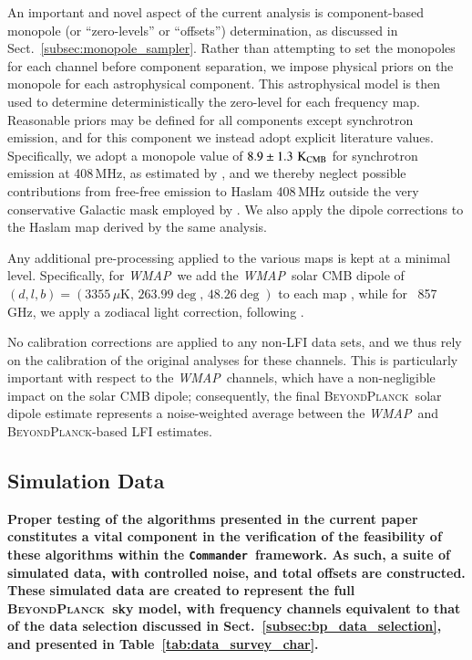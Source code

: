\documentclass[twocolumn]{aa}
\def\WMAP{\emph{WMAP}}
\def\commander{\texttt{Commander}}
\newcommand{\BP}{\textsc{BeyondPlanck}}
\begin{document}
An important and novel aspect of the current analysis is
component-based monopole (or ``zero-levels'' or ``offsets'')
determination, as discussed in Sect.~\ref{subsec:monopole_sampler}. Rather than
attempting to set the monopoles for each channel before component
separation, we impose physical priors on the monopole for each
astrophysical component. This astrophysical model is then used to
determine deterministically the zero-level for each frequency
map. Reasonable priors may be defined for all components except
synchrotron emission, and for this component we instead adopt explicit
literature values. Specifically, we adopt a monopole value of
$8.9\pm1.3\,\KCMB$ for synchrotron emission at 408\,MHz, as estimated
by \citet{wehus2014}, and we thereby neglect possible contributions
from free-free emission to Haslam 408\,MHz outside the very
conservative Galactic mask employed by \citet{wehus2014}. We also
apply the dipole corrections to the Haslam map derived by the same
analysis.

Any additional pre-processing applied to the various maps is kept at a
minimal level. Specifically, for \WMAP\ we add the \WMAP\ solar CMB
dipole of $(d, l, b) = (3355\,\mu\mathrm{K},\,263.99\deg,\,48.26\deg)$ to each map \citep{Hinshaw_2009},
while for \Planck\ 857\,GHz, we apply a zodiacal light correction,
following \citet{npipe}. 

No calibration corrections are applied to any non-LFI data sets, and
we thus rely on the calibration of the original analyses for these
channels. This is particularly important with respect to the
\WMAP\ channels, which have a non-negligible impact on the solar CMB
dipole; consequently, the final \BP\ solar dipole estimate represents
a noise-weighted average between the \WMAP\ and \BP-based
LFI estimates.

\subsection{Simulation Data}
\label{subsec:sim_data}



\textbf{Proper testing of the algorithms presented in the current paper constitutes a vital component in the verification of the feasibility of these algorithms within the \commander\ framework. As such, a suite of simulated data, with controlled noise, and total offsets are constructed. These simulated data are created to represent the full \BP\ sky model, with frequency channels equivalent to that of the data selection discussed in Sect.~\ref{subsec:bp_data_selection}, and presented in Table~\ref{tab:data_survey_char}. }
\end{document}
